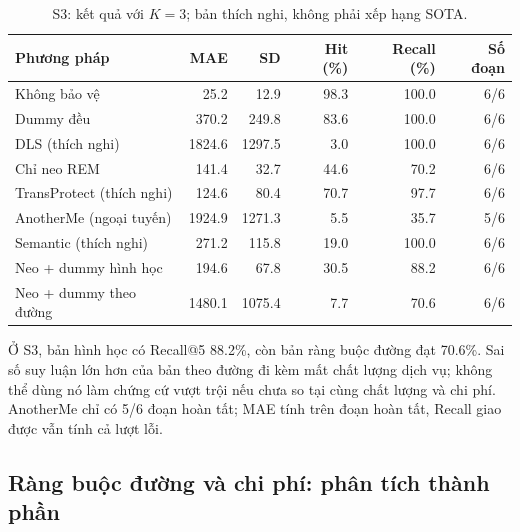 \begin{table}[H]\centering\small

\setlength{\tabcolsep}{4pt}

\caption{S3: kết quả với $K=3$; bản thích nghi, không phải xếp hạng SOTA.}

\begin{tabular}{p{5.0cm}rrrrr}\toprule

Phương pháp & MAE & SD & Hit (\%) & Recall (\%) & Số đoạn\\\midrule

Không bảo vệ & 25.2 & 12.9 & 98.3 & 100.0 & 6/6\\

Dummy đều & 370.2 & 249.8 & 83.6 & 100.0 & 6/6\\

DLS (thích nghi) & 1824.6 & 1297.5 & 3.0 & 100.0 & 6/6\\

Chỉ neo REM & 141.4 & 32.7 & 44.6 & 70.2 & 6/6\\

TransProtect (thích nghi) & 124.6 & 80.4 & 70.7 & 97.7 & 6/6\\

AnotherMe (ngoại tuyến) & 1924.9 & 1271.3 & 5.5 & 35.7 & 5/6\\

Semantic (thích nghi) & 271.2 & 115.8 & 19.0 & 100.0 & 6/6\\

Neo + dummy hình học & 194.6 & 67.8 & 30.5 & 88.2 & 6/6\\

Neo + dummy theo đường & 1480.1 & 1075.4 & 7.7 & 70.6 & 6/6\\

\bottomrule\end{tabular}\end{table}

Ở S3, bản hình học có Recall@5 88.2\%, còn bản ràng buộc đường đạt 70.6\%. Sai số suy luận lớn hơn của bản theo đường đi kèm mất chất lượng dịch vụ; không thể dùng nó làm chứng cứ vượt trội nếu chưa so tại cùng chất lượng và chi phí. AnotherMe chỉ có 5/6 đoạn hoàn tất; MAE tính trên đoạn hoàn tất, Recall giao được vẫn tính cả lượt lỗi.

\subsection{Ràng buộc đường và chi phí: phân tích thành phần}


